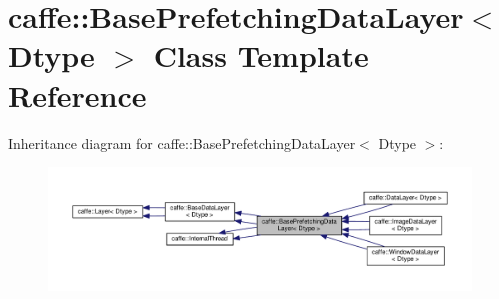 \hypertarget{classcaffe_1_1_base_prefetching_data_layer}{}\section{caffe\+:\+:Base\+Prefetching\+Data\+Layer$<$ Dtype $>$ Class Template Reference}
\label{classcaffe_1_1_base_prefetching_data_layer}


Inheritance diagram for caffe\+:\+:Base\+Prefetching\+Data\+Layer$<$ Dtype $>$\+:
\nopagebreak
\begin{figure}[H]
\begin{center}
\leavevmode
\includegraphics[width=350pt]{classcaffe_1_1_base_prefetching_data_layer__inherit__graph}
\end{center}
\end{figure}
